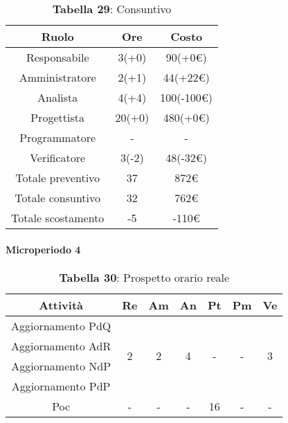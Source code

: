 \begin{table}[H]
	\centering
	\renewcommand{\arraystretch}{1.5}
	\begin{tabular}{|c|c|c|}
		\hline
		\rowcolor{lighter-grayer}
		Ruolo & Ore & Costo \\ \hline
		Responsabile & 3(+0) & 90(+0\euro) \\ \hline
		Amministratore & 2(+1) & 44(+22\euro) \\ \hline
		Analista & 4(+4) & 100(-100\euro) \\ \hline
		Progettista & 20(+0) & 480(+0\euro) \\ \hline
		Programmatore & - & - \\ \hline
		Verificatore & 3(-2) & 48(-32\euro) \\ \hline
		Totale preventivo & 37 & 872\euro \\ \hline
		Totale consuntivo & 32 & 762\euro \\ \hline
		Totale scostamento & -5 & -110\euro \\ \hline
	\end{tabular}
	\caption*{\textbf{Tabella 29}: Consuntivo\\}
\end{table}

\paragraph{Microperiodo 4}
\begin{table}[H]
	\centering
	\begin{tabular}{|c|c|c|c|c|c|c|}
		\hline
		\rowcolor{lighter-grayer}
		\textbf{Attività} & \textbf{Re}        & \textbf{Am}        & \textbf{An}        & \textbf{Pt}        & \textbf{Pm}        & \textbf{Ve}        \\ \hline
		Aggiornamento PdQ & \multirow{4}{*}{2} & \multirow{4}{*}{2} & \multirow{4}{*}{4} & \multirow{4}{*}{-} & \multirow{4}{*}{-} & \multirow{4}{*}{3} \\ \cline{1-1}
		Aggiornamento AdR &                    &                    &                    &                    &                    &                    \\ \cline{1-1}
		Aggiornamento NdP &                    &                    &                    &                    &                    &                    \\ \cline{1-1}
		Aggiornamento PdP &                    &                    &                    &                    &                    &                    \\ \hline
		Poc               & -                  & -                  & -                  & 16                 & -                  & -                  \\ \hline
	\end{tabular}
\caption*{\textbf{Tabella 30}: Prospetto orario reale\\}
\end{table}

